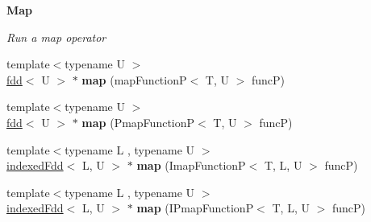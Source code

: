 \begin{Indent}{\bf Map}\par
{\em Run a map operator }\begin{DoxyCompactItemize}
\item 
\hypertarget{classfaster_1_1fdd_a214d07df3240baf348492f9a4186d5cc}{}\label{classfaster_1_1fdd_a214d07df3240baf348492f9a4186d5cc} 
{\footnotesize template$<$typename U $>$ }\\\hyperlink{classfaster_1_1fdd}{fdd}$<$ U $>$ $\ast$ {\bfseries map} (map\+FunctionP$<$ T, U $>$ funcP)
\item 
\hypertarget{classfaster_1_1fdd_a2cfde53328f21d2ffba58dde111219ff}{}\label{classfaster_1_1fdd_a2cfde53328f21d2ffba58dde111219ff} 
{\footnotesize template$<$typename U $>$ }\\\hyperlink{classfaster_1_1fdd}{fdd}$<$ U $>$ $\ast$ {\bfseries map} (Pmap\+FunctionP$<$ T, U $>$ funcP)
\item 
\hypertarget{classfaster_1_1fdd_a17066a9f6526c2c630d730727c6b1b51}{}\label{classfaster_1_1fdd_a17066a9f6526c2c630d730727c6b1b51} 
{\footnotesize template$<$typename L , typename U $>$ }\\\hyperlink{classfaster_1_1indexedFdd}{indexed\+Fdd}$<$ L, U $>$ $\ast$ {\bfseries map} (Imap\+FunctionP$<$ T, L, U $>$ funcP)
\item 
\hypertarget{classfaster_1_1fdd_a61ce985503e31026794696c6c6db20b8}{}\label{classfaster_1_1fdd_a61ce985503e31026794696c6c6db20b8} 
{\footnotesize template$<$typename L , typename U $>$ }\\\hyperlink{classfaster_1_1indexedFdd}{indexed\+Fdd}$<$ L, U $>$ $\ast$ {\bfseries map} (I\+Pmap\+FunctionP$<$ T, L, U $>$ funcP)
\end{DoxyCompactItemize}
\end{Indent}
